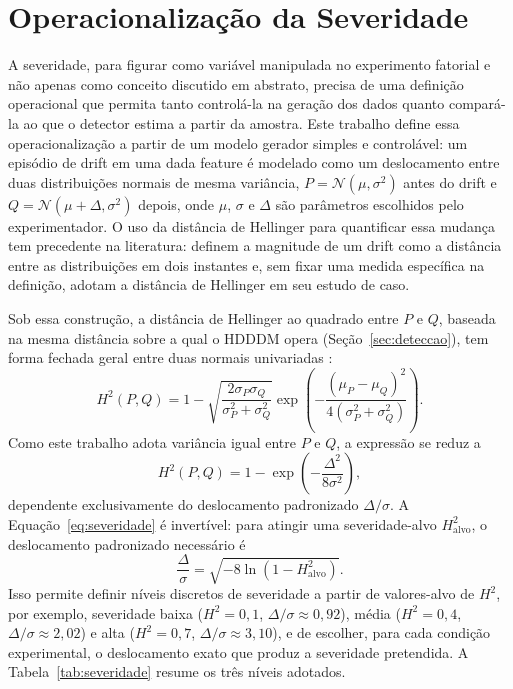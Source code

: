 \section{Operacionalização da Severidade}
\label{sec:severidade}
A severidade, para figurar como variável manipulada no experimento fatorial e
não apenas como conceito discutido em abstrato, precisa de uma definição
operacional que permita tanto controlá-la na geração dos dados quanto
compará-la ao que o detector estima a partir da amostra. Este trabalho define
essa operacionalização a partir de um modelo gerador simples e controlável: um
episódio de drift em uma dada feature é modelado como um deslocamento entre
duas distribuições normais de mesma variância, $P = \mathcal{N}(\mu, \sigma^2)$
antes do drift e $Q = \mathcal{N}(\mu + \Delta, \sigma^2)$ depois, onde $\mu$,
$\sigma$ e $\Delta$ são parâmetros escolhidos pelo experimentador. O uso da
distância de Hellinger para quantificar essa mudança tem precedente na
literatura:  definem a magnitude de um drift como a
distância entre as distribuições em dois instantes e, sem fixar uma medida
específica na definição, adotam a distância de Hellinger em seu estudo de
caso.

Sob essa construção, a distância de Hellinger ao quadrado entre $P$ e $Q$,
baseada na mesma distância sobre a qual o HDDDM opera \cite{ditzler2011}
(Seção~\ref{sec:deteccao}), tem forma fechada geral entre duas normais
univariadas \cite{pardo2006}:
\begin{equation}
H^2(P, Q) = 1 - \sqrt{\frac{2\sigma_P\sigma_Q}{\sigma_P^2+\sigma_Q^2}}
\exp\left(-\frac{(\mu_P-\mu_Q)^2}{4(\sigma_P^2+\sigma_Q^2)}\right).
\end{equation}
Como este trabalho adota variância igual entre $P$ e $Q$, a expressão se
reduz a
\begin{equation}
H^2(P, Q) = 1 - \exp\left(-\frac{\Delta^2}{8\sigma^2}\right),
\label{eq:severidade}
\end{equation}
dependente exclusivamente do deslocamento padronizado $\Delta/\sigma$. A
Equação~\ref{eq:severidade} é invertível: para atingir uma severidade-alvo
$H^2_{\text{alvo}}$, o deslocamento padronizado necessário é
\begin{equation}
\frac{\Delta}{\sigma} = \sqrt{-8\ln\left(1-H^2_{\text{alvo}}\right)}.
\end{equation}
Isso permite definir níveis discretos de severidade a partir de valores-alvo
de $H^2$, por exemplo, severidade baixa ($H^2=0{,}1$, $\Delta/\sigma
\approx 0{,}92$), média ($H^2=0{,}4$, $\Delta/\sigma \approx 2{,}02$) e alta
($H^2=0{,}7$, $\Delta/\sigma \approx 3{,}10$), e de escolher, para cada
condição experimental, o deslocamento exato que produz a severidade
pretendida. A Tabela~\ref{tab:severidade} resume os
três níveis adotados.

